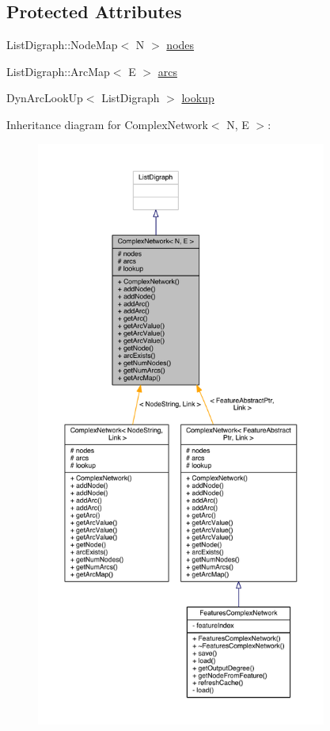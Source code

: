 \subsection*{Protected Attributes}
\begin{DoxyCompactItemize}
\item 
List\+Digraph\+::\+Node\+Map$<$ N $>$ \hyperlink{class_complex_network_ab859f9614083b288b3353962c99681cd}{nodes}
\item 
List\+Digraph\+::\+Arc\+Map$<$ E $>$ \hyperlink{class_complex_network_a5d466d263d5013364c264497a0c797a8}{arcs}
\item 
Dyn\+Arc\+Look\+Up$<$ List\+Digraph $>$ \hyperlink{class_complex_network_a15c45cf68f6d708af9ca46a1a155a115}{lookup}
\end{DoxyCompactItemize}


Inheritance diagram for Complex\+Network$<$ N, E $>$\+:
\nopagebreak
\begin{figure}[H]
\begin{center}
\leavevmode
\includegraphics[height=550pt]{class_complex_network__inherit__graph}
\end{center}
\end{figure}


